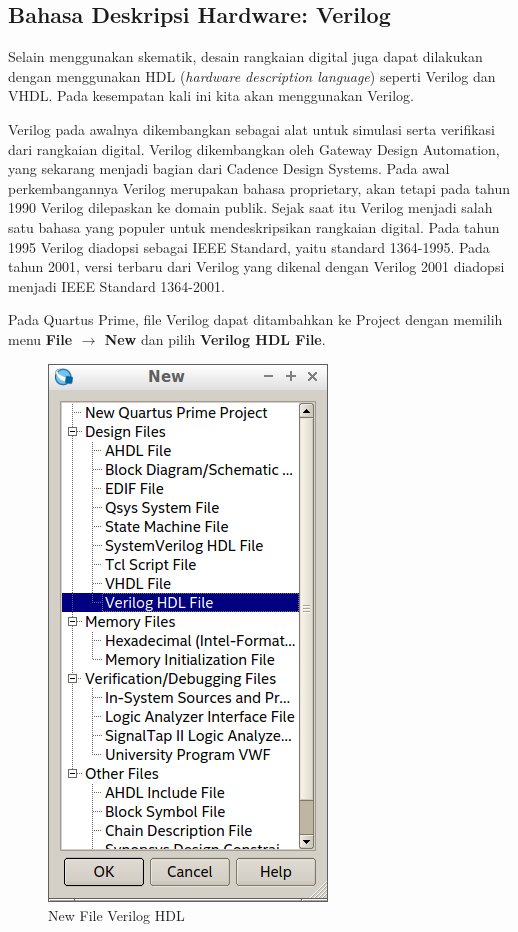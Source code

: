 \subsection{Bahasa Deskripsi Hardware: Verilog}

Selain menggunakan skematik, desain rangkaian digital juga dapat dilakukan
dengan menggunakan HDL (\textit{hardware description language})
seperti Verilog dan VHDL.
Pada kesempatan kali ini kita akan menggunakan Verilog.

Verilog pada awalnya dikembangkan sebagai alat untuk simulasi serta
verifikasi dari rangkaian digital.
Verilog dikembangkan oleh Gateway Design Automation, yang
sekarang menjadi bagian dari Cadence Design Systems.
Pada awal perkembangannya Verilog merupakan bahasa
proprietary, akan tetapi pada
tahun 1990 Verilog dilepaskan ke
domain publik. Sejak saat itu Verilog menjadi salah satu
bahasa yang populer untuk mendeskripsikan rangkaian digital.
Pada tahun 1995 Verilog diadopsi sebagai IEEE Standard, yaitu standard
1364-1995. Pada tahun 2001, versi terbaru dari Verilog yang dikenal dengan
Verilog 2001 diadopsi menjadi IEEE Standard 1364-2001.

Pada Quartus Prime, file Verilog dapat ditambahkan ke Project
dengan memilih menu \textbf{File $\rightarrow$ New} dan pilih
\textbf{Verilog HDL File}.

\begin{figure}[H]
\centering
\includegraphics[scale=0.5]{images/new_file_verilog.png}
\par
\caption{New File Verilog HDL}
\end{figure}

